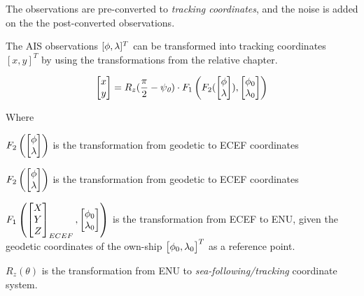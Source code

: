 The observations are pre-converted to \emph{tracking coordinates}, and the noise is added on the the post-converted observations.

The AIS observations $[{\phi}, {\lambda}]^{T}$ can be transformed into tracking coordinates $[x,y]^{T}$ by using the transformations from the relative chapter.


\begin{equation}
\begin{bmatrix}
x \\
y
\end{bmatrix} = R_z(\frac{\pi}{2}-{\psi}_{\textit{0}}) \cdot F_1\left(F_2(\begin{bmatrix}
{\phi} \\
{\lambda}
\end{bmatrix}),\begin{bmatrix}
{\phi}_0 \\ {\lambda}_0
\end{bmatrix}\right)
\end{equation}

Where

\begin{description}
	\item $F_2\left(\begin{bmatrix}
	{\phi} \\
	{\lambda}
	\end{bmatrix}\right)$ is the transformation from geodetic to ECEF coordinates
	\item $F_2\left(\begin{bmatrix}
	{\phi} \\
	{\lambda}
	\end{bmatrix}\right)$ is the transformation from geodetic to ECEF coordinates
	\item $F_1\left( \begin{bmatrix}
	X \\
	Y \\
	Z
	\end{bmatrix}_{ECEF},\begin{bmatrix}
	{\phi}_0 \\
	{\lambda}_0
	\end{bmatrix}\right)$ is the transformation from ECEF to ENU, given the geodetic coordinates of the own-ship $\begin{bmatrix}
	{\phi}_0,
	{\lambda}_0
	\end{bmatrix}^T$ as a reference point.
	\item $R_z(\theta)$ is the transformation from ENU to \emph{sea-following/tracking }coordinate system.
\end{description}

